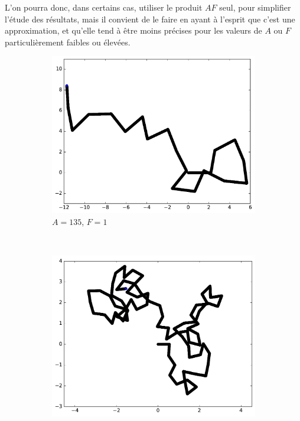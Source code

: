 	
	L'on pourra donc, dans certains cas, utiliser le produit $AF$ seul, pour simplifier l'étude des résultats, mais il convient de le faire en ayant à l'esprit que c'est une approximation, et qu'elle tend à être moins précises pour les valeurs de $A$ ou $F$ particulièrement faibles ou élevées.
	
	\begin{figure}[htb]
		\begin{subfigure}[t]{\subImgWmo}
			\centering
			\includegraphics[width=\textwidth]{figures/ch3/synTraj_219_135_1}
			\caption[$A = 135$, $F=1$]{$A = 135$, $F=1$}
			\label{fig:synTraj_219_135_1}
		\end{subfigure}
		~
		\begin{subfigure}[t]{\subImgWmo}
			\centering
			\includegraphics[width=\textwidth]{figures/ch3/synTraj_219_135_4}

\end{subfigure}
\end{figure}
